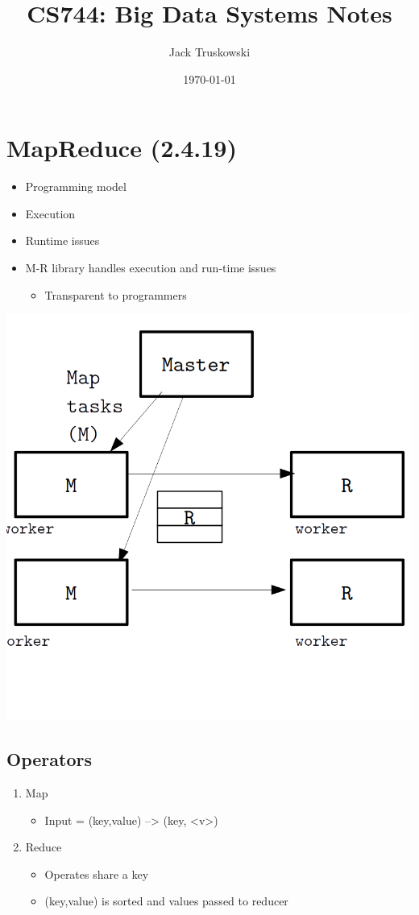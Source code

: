 \documentclass[11pt]{article}
\author{Jack Truskowski}
\date{\today}
\title{CS744: Big Data Systems Notes}
\begin{document}
\maketitle
\tableofcontents


\section{MapReduce (2.4.19)}
\label{sec:orgheadline4}
\begin{itemize}
\item Programming model
\item Execution
\item Runtime issues
\item M-R library handles execution and run-time issues
\begin{itemize}
\item Transparent to programmers
\end{itemize}
\end{itemize}

\includegraphics[width=.9\linewidth]{diagrams/masterworker.png}

\subsection{Operators}
\label{sec:orgheadline1}
\begin{enumerate}
\item Map
\begin{itemize}
\item Input = (key,value) --> (key, <v>)
\end{itemize}
\item Reduce
\begin{itemize}
\item Operates share a key
\item (key,value) is sorted and values passed to reducer
\end{itemize}
\end{enumerate}
\end{document}
